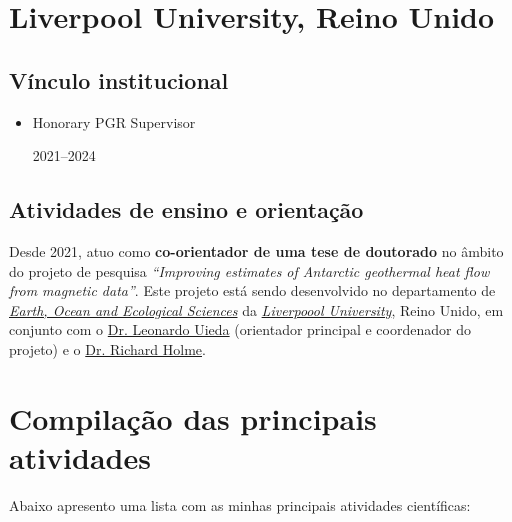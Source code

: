 \section{Liverpool University, Reino Unido}


\subsection*{Vínculo institucional}


\begin{itemize}
	
	\item[\parbox{0.03\textwidth}{\vspace{-0.3\baselineskip}\faClipboardList}]
	{Honorary PGR Supervisor \dotfill \parbox{0.11\textwidth}{\hfill 2021--2024}} 
	
\end{itemize}

\subsection*{Atividades de ensino e orientação}

Desde 2021, atuo como \textbf{co-orientador de uma tese de doutorado} no 
âmbito do projeto de pesquisa \textit{``Improving estimates of Antarctic geothermal heat flow from magnetic data''}. Este projeto está sendo desenvolvido no departamento de
\href{https://www.liverpool.ac.uk/earth-ocean-and-ecological-sciences/}{\textit{Earth, Ocean and Ecological Sciences}} da 
\href{https://www.liverpool.ac.uk/}{\textit{Liverpoool University}}, Reino Unido, em
conjunto com o 
\href{https://www.liverpool.ac.uk/environmental-sciences/staff/leonardo-uieda/}{Dr. Leonardo Uieda} (orientador principal e coordenador do projeto) e o
\href{https://www.liverpool.ac.uk/environmental-sciences/staff/richard-holme/}{Dr. Richard Holme}.


\section{Compilação das principais atividades}


Abaixo apresento uma lista com as minhas principais atividades científicas:

